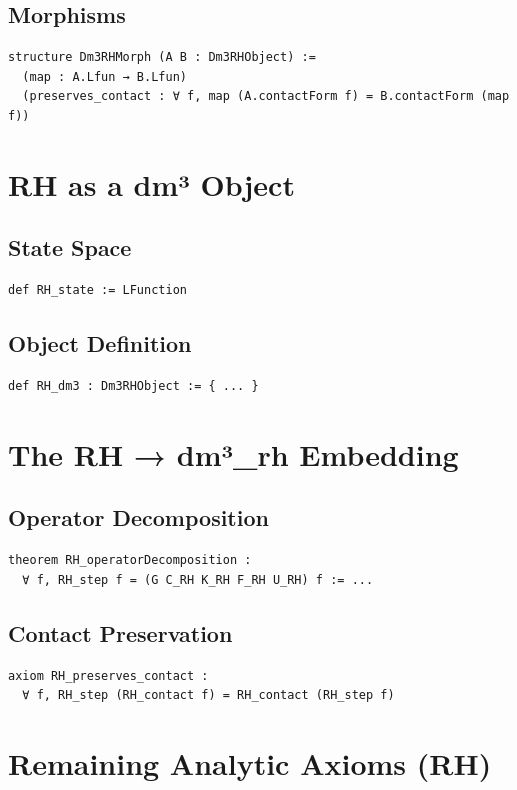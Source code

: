 \documentclass[11pt,a4paper]{article}
\begin{document}
\subsection{Morphisms}
\begin{lstlisting}
structure Dm3RHMorph (A B : Dm3RHObject) :=
  (map : A.Lfun → B.Lfun)
  (preserves_contact : ∀ f, map (A.contactForm f) = B.contactForm (map f))
\end{lstlisting}

\section{RH as a dm³ Object}

\subsection{State Space}
\begin{lstlisting}
def RH_state := LFunction
\end{lstlisting}

\subsection{Object Definition}
\begin{lstlisting}
def RH_dm3 : Dm3RHObject := { ... }
\end{lstlisting}

\section{The RH → dm³\_rh Embedding}

\subsection{Operator Decomposition}
\begin{lstlisting}
theorem RH_operatorDecomposition :
  ∀ f, RH_step f = (G C_RH K_RH F_RH U_RH) f := ...
\end{lstlisting}

\subsection{Contact Preservation}
\begin{lstlisting}
axiom RH_preserves_contact :
  ∀ f, RH_step (RH_contact f) = RH_contact (RH_step f)
\end{lstlisting}

\section{Remaining Analytic Axioms (RH)}
\end{document}
